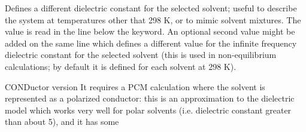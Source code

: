 \begin{keywordlist}
Defines a different dielectric constant for the selected solvent; useful to describe
the system at temperatures other that 298 K, or to mimic solvent mixtures.
The value is read in the line below the keyword.
An optional second value might be added on the same line which
defines a different value for the infinite frequency dielectric constant for
the selected solvent (this is used in non-equilibrium calculations; by
default it is defined for each solvent at 298 K).
\item[CONDuctor version]
It requires a PCM calculation where the solvent is represented as a polarized conductor:
this is an approximation to the dielectric model which works very well for
polar solvents (i.e. dielectric constant greater than about 5), and it has some

\end{keywordlist}
